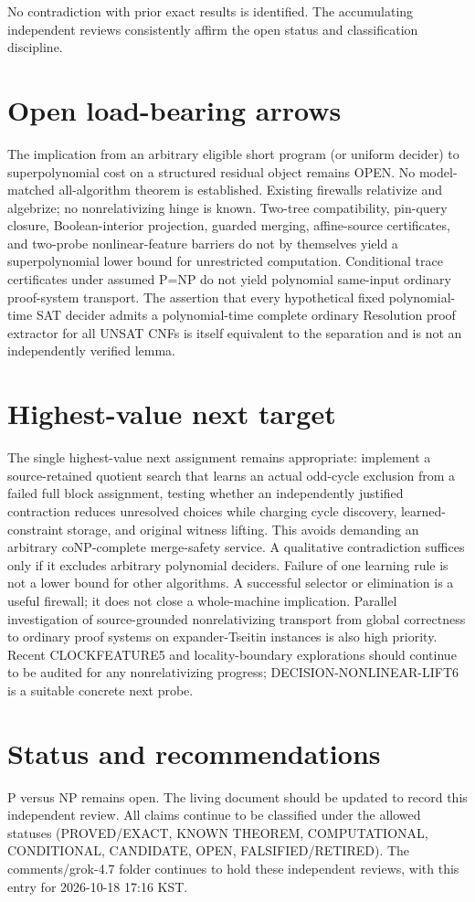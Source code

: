 \documentclass[11pt]{article}
\begin{document}
No contradiction with prior exact results is identified. The accumulating independent reviews consistently affirm the open status and classification discipline.

\section{Open load-bearing arrows}
The implication from an arbitrary eligible short program (or uniform decider) to superpolynomial cost on a structured residual object remains OPEN. No model-matched all-algorithm theorem is established. Existing firewalls relativize and algebrize; no nonrelativizing hinge is known. Two-tree compatibility, pin-query closure, Boolean-interior projection, guarded merging, affine-source certificates, and two-probe nonlinear-feature barriers do not by themselves yield a superpolynomial lower bound for unrestricted computation. Conditional trace certificates under assumed P=NP do not yield polynomial same-input ordinary proof-system transport. The assertion that every hypothetical fixed polynomial-time SAT decider admits a polynomial-time complete ordinary Resolution proof extractor for all UNSAT CNFs is itself equivalent to the separation and is not an independently verified lemma.

\section{Highest-value next target}
The single highest-value next assignment remains appropriate: implement a source-retained quotient search that learns an actual odd-cycle exclusion from a failed full block assignment, testing whether an independently justified contraction reduces unresolved choices while charging cycle discovery, learned-constraint storage, and original witness lifting. This avoids demanding an arbitrary coNP-complete merge-safety service. A qualitative contradiction suffices only if it excludes arbitrary polynomial deciders. Failure of one learning rule is not a lower bound for other algorithms. A successful selector or elimination is a useful firewall; it does not close a whole-machine implication. Parallel investigation of source-grounded nonrelativizing transport from global correctness to ordinary proof systems on expander-Tseitin instances is also high priority. Recent CLOCKFEATURE5 and locality-boundary explorations should continue to be audited for any nonrelativizing progress; DECISION-NONLINEAR-LIFT6 is a suitable concrete next probe.

\section{Status and recommendations}
P versus NP remains open. The living document should be updated to record this independent review. All claims continue to be classified under the allowed statuses (PROVED/EXACT, KNOWN THEOREM, COMPUTATIONAL, CONDITIONAL, CANDIDATE, OPEN, FALSIFIED/RETIRED). The comments/grok-4.7 folder continues to hold these independent reviews, with this entry for 2026-10-18 17:16 KST.

\end{document}

